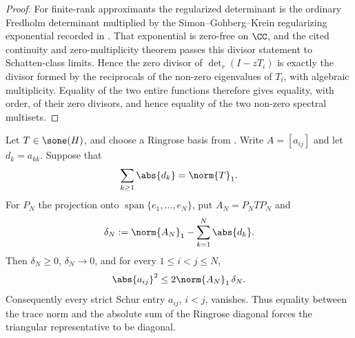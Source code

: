 \begin{proof}
  For finite-rank approximants the regularized determinant is the ordinary
  Fredholm determinant multiplied by the Simon--Gohberg--Krein regularizing
  exponential recorded in
  .  That
  exponential is zero-free on \(\CC\), and the cited continuity and
  zero-multiplicity theorem passes this divisor statement to Schatten-class
  limits. Hence the zero divisor of \(\det_r(I-zT_i)\) is exactly the divisor
  formed by the reciprocals of the non-zero eigenvalues of \(T_i\), with
  algebraic multiplicity. Equality of the two entire functions therefore gives
  equality, with order, of their zero divisors, and hence equality of the two
  non-zero spectral multisets.
\end{proof}

\begin{lemma}
  \label{lem:trace-triangular-equality-pinching}
  Let \(T\in\sone(H)\), and choose a Ringrose basis from
  . Write \(A=[a_{ij}]\) and let
  \(d_k=a_{kk}\). Suppose that
  \[
    \sum_{k\ge1}\abs{d_k}=\norm{T}_1.
  \]
  For \(P_N\) the projection onto
  \(\operatorname{span}\{e_1,\ldots,e_N\}\), put \(A_N=P_NTP_N\) and
  \[
    \delta_N:=\norm{A_N}_1-\sum_{k=1}^N\abs{d_k}.
  \]
  Then \(\delta_N\ge0\), \(\delta_N\to0\), and for every
  \(1\le i<j\le N\),
  \[
    \abs{a_{ij}}^2\le 2\norm{A_N}_1\,\delta_N.
  \]
  Consequently every strict Schur entry \(a_{ij}\), \(i<j\), vanishes.
  Thus equality between the trace norm and the absolute sum of the
  Ringrose diagonal forces the triangular representative to be diagonal.
\end{lemma}

